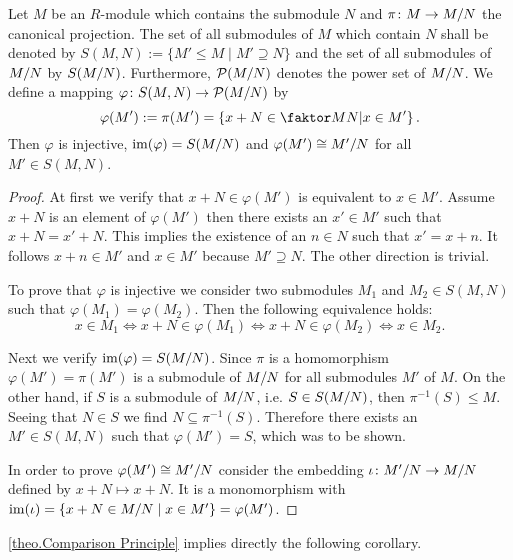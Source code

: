\begin{thm} \label{theo.Comparison Principle}
Let $M$ be an $R$-module which contains the submodule $N$ and $\pi\colon M\to\MtN$ the canonical projection. The set of all submodules of $M$ which contain $N$ shall be denoted by $S(M,N):=\lbrace M'\leq M \mid M'\supseteq N\rbrace$ and the set of all submodules of $\MtN$ by $S(\MtN)$. Furthermore, $\mathcal{P}(\MtN)$ denotes the power set of $\MtN$. We define a mapping $\varphi\colon S(M,N)\to \mathcal{P}(\MtN)$ by
\begin{equation*}
\varphi(M'):=\pi(M')=\left\lbrace x+N\in \MTN \middle\arrowvert x\in M'\right\rbrace.
\end{equation*}
Then $\varphi$ is injective, $\im(\varphi)=S(\MtN)$ and $\varphi(M')\cong\nicefrac{M'}{N}$ for all $M'\in S(M,N)$.
\end{thm}
\begin{proof}
At first we verify that $x+N\in \varphi(M')$ is equivalent to $x\in M'$. Assume $x+N$ is an element of $\varphi(M')$ then there exists an $x'\in M'$ such that $x+N=x'+N$. This implies the existence of an $n\in N$ such that $x'=x+n$. It follows $x+n\in M'$ and $x\in M'$ because $M'\supseteq N$. The other direction is trivial.

To prove that $\varphi$ is injective we consider two submodules $M_1$ and $M_2\in S(M,N)$ such that $\varphi(M_1)=\varphi(M_2)$. Then the following equivalence holds:
\begin{equation*}
x\in M_1\Leftrightarrow x+N\in \varphi(M_1)\Leftrightarrow x+N\in\varphi(M_2)\Leftrightarrow x\in M_2.
\end{equation*}

Next we verify $\im(\varphi)=S(\MtN)$. Since $\pi$ is a homomorphism $\varphi(M')=\pi(M')$ is a submodule of $\MtN$ for all submodules $M'$ of $M$. On the other hand, if $S$ is a submodule of $\MtN$, i.e. $S\in S(\MtN)$, then $\pi^{-1}(S)\leq M$. Seeing that $N\in S$ we find $N\subseteq\pi^{-1}(S)$. Therefore there exists an $M'\in S(M,N)$ such that $\varphi(M')=S$, which was to be shown.

In order to prove $\varphi(M')\cong\nicefrac{M'}{N}$ consider the embedding $\iota\colon \nicefrac{M'}{N}\to\MtN$ defined by $x+N\mapsto x+N$. It is a monomorphism with $\im(\iota)=\lbrace x+N\in\MtN \mid x\in M'\rbrace=\varphi(M')$.
\end{proof}

\cref{theo.Comparison Principle} implies directly the following corollary.

